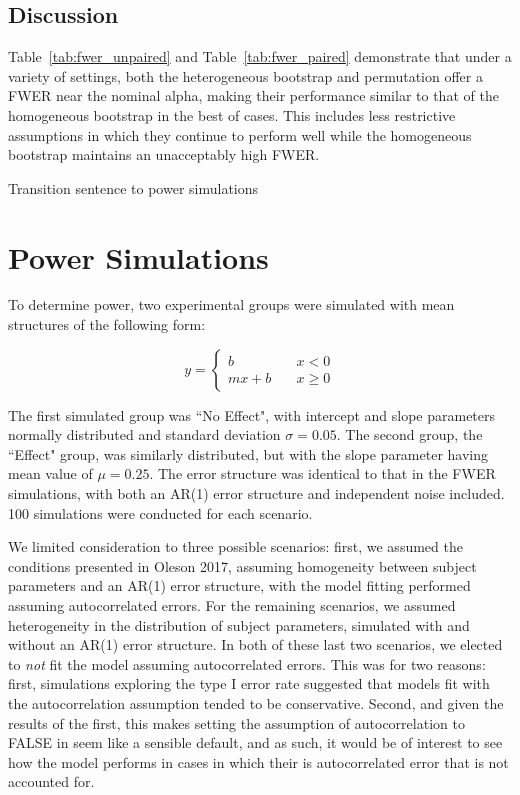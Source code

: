 \subsection{Discussion}

Table~\ref{tab:fwer_unpaired} and Table~\ref{tab:fwer_paired} demonstrate that under a variety of settings, both the heterogeneous bootstrap and permutation offer a FWER near the nominal alpha, making their performance similar to that of the homogeneous bootstrap in the best of cases. This includes less restrictive assumptions in which they continue to perform well while the homogeneous bootstrap maintains an unacceptably high FWER. 

Transition sentence to power simulations

\section{Power Simulations}


To determine power, two experimental groups were simulated with mean structures of the following form:

\begin{equation}\label{eq:piecewise_form}
y = \begin{cases}
b \quad &x < 0 \\
mx + b \quad &x \geq 0
\end{cases}
\end{equation}

The first simulated group was ``No Effect", with intercept and slope parameters normally distributed and standard deviation $\sigma = 0.05$. The second group, the ``Effect" group, was similarly distributed, but with the slope parameter having mean value of $\mu = 0.25$. The error structure was identical to that in the FWER simulations, with both an AR(1) error structure and independent noise included. 100 simulations were conducted for each scenario. 

We limited consideration to three possible scenarios: first, we assumed the conditions presented in Oleson 2017, assuming homogeneity between subject parameters and an AR(1) error structure, with the model fitting performed assuming autocorrelated errors. For the remaining scenarios, we assumed heterogeneity in the distribution of subject parameters, simulated with and without an AR(1) error structure. In both of these last two scenarios, we elected to \textit{not} fit the model assuming autocorrelated errors. This was for two reasons: first, simulations exploring the type I error rate suggested that models fit with the autocorrelation assumption tended to be conservative. Second, and given the results of the first, this makes setting the assumption of autocorrelation to FALSE in  seem like a sensible default, and as such, it would be of interest to see how the model performs in cases in which their is autocorrelated error that is not accounted for.

